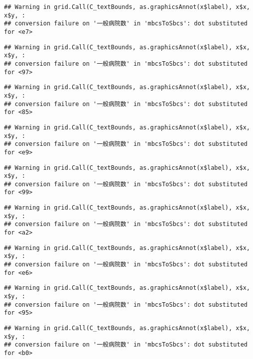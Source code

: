 \documentclass[
]{article}
\begin{document}
\begin{verbatim}
## Warning in grid.Call(C_textBounds, as.graphicsAnnot(x$label), x$x, x$y, :
## conversion failure on '一般病院数' in 'mbcsToSbcs': dot substituted for <e7>
\end{verbatim}

\begin{verbatim}
## Warning in grid.Call(C_textBounds, as.graphicsAnnot(x$label), x$x, x$y, :
## conversion failure on '一般病院数' in 'mbcsToSbcs': dot substituted for <97>
\end{verbatim}

\begin{verbatim}
## Warning in grid.Call(C_textBounds, as.graphicsAnnot(x$label), x$x, x$y, :
## conversion failure on '一般病院数' in 'mbcsToSbcs': dot substituted for <85>
\end{verbatim}

\begin{verbatim}
## Warning in grid.Call(C_textBounds, as.graphicsAnnot(x$label), x$x, x$y, :
## conversion failure on '一般病院数' in 'mbcsToSbcs': dot substituted for <e9>
\end{verbatim}

\begin{verbatim}
## Warning in grid.Call(C_textBounds, as.graphicsAnnot(x$label), x$x, x$y, :
## conversion failure on '一般病院数' in 'mbcsToSbcs': dot substituted for <99>
\end{verbatim}

\begin{verbatim}
## Warning in grid.Call(C_textBounds, as.graphicsAnnot(x$label), x$x, x$y, :
## conversion failure on '一般病院数' in 'mbcsToSbcs': dot substituted for <a2>
\end{verbatim}

\begin{verbatim}
## Warning in grid.Call(C_textBounds, as.graphicsAnnot(x$label), x$x, x$y, :
## conversion failure on '一般病院数' in 'mbcsToSbcs': dot substituted for <e6>
\end{verbatim}

\begin{verbatim}
## Warning in grid.Call(C_textBounds, as.graphicsAnnot(x$label), x$x, x$y, :
## conversion failure on '一般病院数' in 'mbcsToSbcs': dot substituted for <95>
\end{verbatim}

\begin{verbatim}
## Warning in grid.Call(C_textBounds, as.graphicsAnnot(x$label), x$x, x$y, :
## conversion failure on '一般病院数' in 'mbcsToSbcs': dot substituted for <b0>
\end{verbatim}
\end{document}
